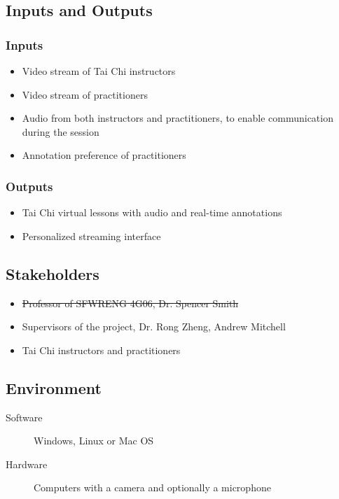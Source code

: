 \documentclass{article}
\begin{document}
\subsection{Inputs and Outputs}

\subsubsection{Inputs}

\begin{itemize}
\item Video stream of Tai Chi instructors
\item Video stream of practitioners
\item Audio from both instructors and practitioners, to enable communication during
  the session
\item Annotation preference of practitioners
\end{itemize}

\subsubsection{Outputs}

\begin{itemize}
\item Tai Chi virtual lessons with audio and real-time annotations
\item Personalized streaming interface
\end{itemize}

\subsection{Stakeholders}

\begin{itemize}
\item \sout{Professor of SFWRENG 4G06, Dr. Spencer Smith}
\item Supervisors of the project, Dr. Rong Zheng, Andrew Mitchell
\item Tai Chi instructors and practitioners
\end{itemize}

\subsection{Environment}

\begin{description}
\item[Software] Windows, Linux or Mac OS
\item[Hardware] Computers with a camera and optionally a microphone
\end{description}
\end{document}
